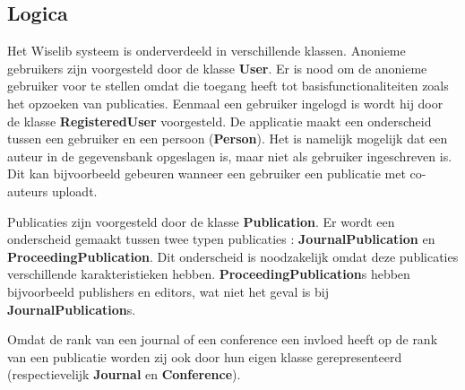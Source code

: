 \subsection{Logica}

Het Wiselib systeem is onderverdeeld in verschillende klassen. Anonieme gebruikers zijn voorgesteld door de klasse \textbf{User}. 
Er is nood om de anonieme gebruiker voor te stellen omdat die toegang heeft tot basisfunctionaliteiten zoals het opzoeken van publicaties.
Eenmaal een gebruiker ingelogd is wordt hij door de klasse \textbf{RegisteredUser} voorgesteld. 
De applicatie maakt een onderscheid tussen een gebruiker en een persoon (\textbf{Person}).
Het is namelijk mogelijk dat een auteur in de gegevensbank opgeslagen is, maar niet als gebruiker ingeschreven is. 
Dit kan bijvoorbeeld gebeuren wanneer een gebruiker een publicatie met co-auteurs uploadt.

Publicaties zijn voorgesteld door de klasse \textbf{Publication}. Er wordt een onderscheid gemaakt tussen twee typen publicaties : \textbf{JournalPublication} en \textbf{ProceedingPublication}.
Dit onderscheid is noodzakelijk omdat deze publicaties verschillende karakteristieken hebben. \textbf{ProceedingPublication}s hebben bijvoorbeeld publishers en editors, wat niet het geval is bij \textbf{JournalPublication}s.

Omdat de rank van een journal of een conference een invloed heeft op de rank van een publicatie worden zij ook door hun eigen klasse gerepresenteerd (respectievelijk \textbf{Journal} en \textbf{Conference}).

